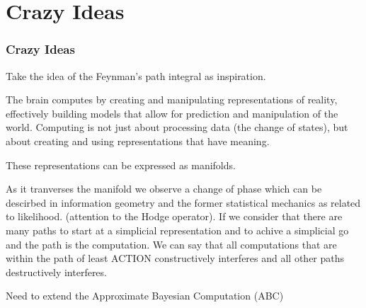 \documentclass{beamer}
\begin{document}
\section{Crazy Ideas}
\begin{frame}
\frametitle{Crazy Ideas}

Take the idea of the Feynman's path integral as inspiration.

The brain computes by creating and manipulating representations of reality, effectively building models that allow for prediction and manipulation of the world. Computing is not just about processing data (the change of states), but about creating and using representations that have meaning.

These representations can be expressed as manifolds. 

As it tranverses the manifold we observe a change of phase which can be descirbed in information geometry and the former statistical mechanics as related to likelihood. (attention to the Hodge operator). If we consider that there are many paths to start at a simplicial representation and to achive a simplicial go and the path is the computation. We can say that all computations that are within the path of least ACTION constructively interferes and all other paths destructively interferes.

Need to extend the Approximate Bayesian Computation (ABC) 


\end{frame}



\end{document}
